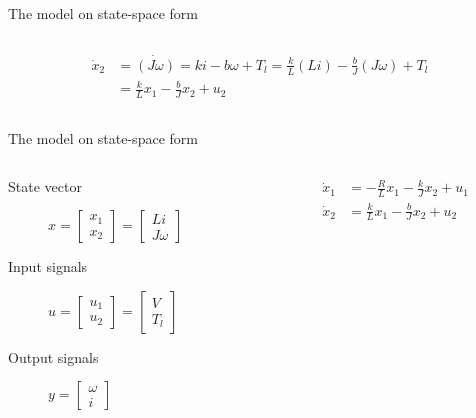 \documentclass[presentation,aspectratio=169]{beamer}
\begin{document}
\begin{frame}[label={sec:org454c7ae}]{The model on state-space form}
\begin{columns}
\begin{column}{0.6\columnwidth}
\pause

\begin{align*}
  \dot{x}_2 &= \dot{(J\omega)} = ki -b\omega + T_l = \frac{k}{L}(Li) - \frac{b}{J}(J\omega) + T_l\\
            &=  \frac{k}{L}x_1 - \frac{b}{J}x_2 + u_2
\end{align*}
\end{column}
\end{columns}
\end{frame}



\begin{frame}[label={sec:org9464df1}]{The model on state-space form}
\begin{columns}
\begin{column}{0.4\columnwidth}
\begin{description}
\item[{State vector}] \(x = \begin{bmatrix} x_1 \\x_2 \end{bmatrix} = \begin{bmatrix} Li \\J\omega \end{bmatrix}\)
\item[{Input signals}] \(u =  \begin{bmatrix} u_1 \\ u_2 \end{bmatrix} = \begin{bmatrix} V\\ T_l \end{bmatrix}\)
\item[{Output signals}] \(y =  \begin{bmatrix}\omega\\ i \end{bmatrix}\)
\end{description}
\end{column}



\begin{column}{0.6\columnwidth}
\begin{align*}
  \dot{x}_1  &= - \frac{R}{L}x_1 - \frac{k}{J}x_2 + u_1\\
  \dot{x}_2  &=  \frac{k}{L}x_1 - \frac{b}{J}x_2 + u_2
\end{align*}


\end{column}
\end{columns}
\end{frame}
\end{document}
